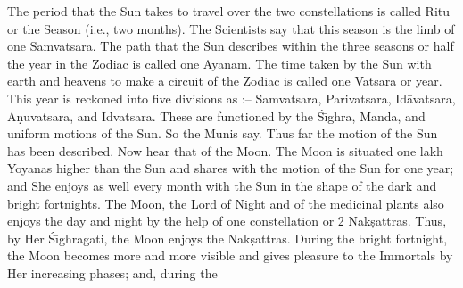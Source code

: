 The period that the Sun takes to travel over the two constellations is called Ritu or the Season (i.e., two months). The Scientists say that this season is the limb of one Samvatsara. The path that the Sun describes within the three seasons or half the year in the Zodiac is called one Ayanam. The time taken by the Sun with earth and heavens to make a circuit of the Zodiac is called one Vatsara or year. This year is reckoned into five divisions as :-- Samvatsara, Parivatsara, Id\=avatsara, A\d{n}uvatsara, and Idvatsara. These are functioned by the \'S\={\i}ghra, Manda, and uniform motions of the Sun. So the Munis say. Thus far the motion of the Sun has been described. Now hear that of the Moon. The Moon is situated one lakh Yoyanas higher than the Sun and shares with the motion of the Sun for one year; and She enjoys as well every month with the Sun in the shape of the dark and bright fortnights. The Moon, the Lord of Night and of the medicinal plants also enjoys the day and night by the help of one constellation or 2 Nak\d{s}attras. Thus, by Her \'S\={\i}ghragati, the Moon enjoys the Nak\d{s}attras. During the bright fortnight, the Moon becomes more and more visible and gives pleasure to the Immortals by Her increasing phases; and, during the


